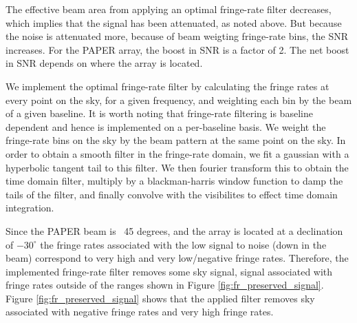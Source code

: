 \documentclass[twocolumn,numberedappendix]{emulateapj} \shorttitle{PSA64}
\begin{document}
The effective beam area from applying an optimal fringe-rate filter decreases,
which implies that the signal has been attenuated, as noted above. But because
the noise is attenuated more, because of beam weigting fringe-rate bins, the SNR
increases. For the PAPER array, the boost in SNR is a factor of 2. The net boost
in SNR depends on where the array is located. 

We implement the optimal fringe-rate filter by calculating the fringe rates at
every point on the sky, for a given frequency, and weighting each bin by the
beam of a given baseline. It is worth noting that fringe-rate filtering is
baseline dependent and hence is implemented on a per-baseline basis. We weight
the fringe-rate bins on the sky by the beam pattern at the same point on the
sky. In order to obtain a smooth filter in the fringe-rate domain, we fit a
gaussian with a hyperbolic tangent tail to this filter. %
We then fourier transform this to obtain the time
domain filter, multiply by a blackman-harris window function to damp the tails
of the filter, and finally convolve with the visibilites to effect time domain
integration.

Since the PAPER beam is ~45 degrees, and the array is located at a declination
of $-30^{\circ}$ the fringe rates associated with the low signal to noise (down
in the beam) correspond to very high and very low/negative fringe rates.
Therefore, the implemented fringe-rate filter removes
some sky signal, signal associated with fringe rates outside of the ranges shown
in Figure \ref{fig:fr_preserved_signal}. Figure \ref{fig:fr_preserved_signal} shows
that the applied filter removes sky associated with negative fringe rates and
very high fringe rates. 

\end{document}
